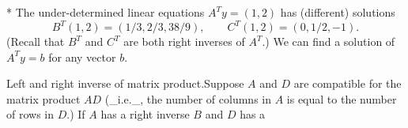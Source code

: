 * The under-determined linear equations \(A^{T}y=(1,2)\) has (different) solutions \[B^{T}(1,2)=(1/3,2/3,38/9),\qquad C^{T}(1,2)=(0,1/2,-1).\] (Recall that \(B^{T}\) and \(C^{T}\) are both right inverses of \(A^{T}\).) We can find a solution of \(A^{T}y=b\) for any vector \(b\).

Left and right inverse of matrix product.Suppose \(A\) and \(D\) are compatible for the matrix product \(AD\) (_i.e._, the number of columns in \(A\) is equal to the number of rows in \(D\).) If \(A\) has a right inverse \(B\) and \(D\) has a 